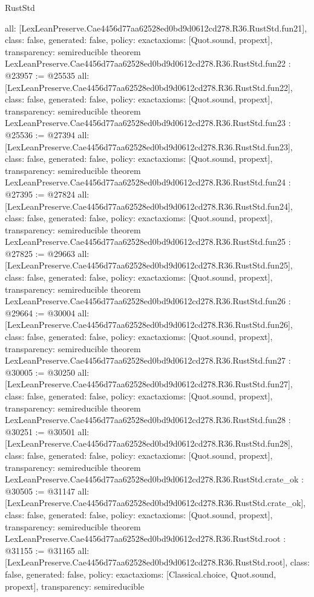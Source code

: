 \begin{lexlean}{RustStd}
\begin{coremodule}
{  all: [LexLeanPreserve.Cae4456d77aa62528ed0bd9d0612cd278.R36.RustStd.fun21],
  class: false,
  generated: false,
  policy: exact{axioms: [Quot.sound, propext]},
  transparency: semireducible
}
theorem LexLeanPreserve.Cae4456d77aa62528ed0bd9d0612cd278.R36.RustStd.fun22 : @23957 := @25535 {
  all: [LexLeanPreserve.Cae4456d77aa62528ed0bd9d0612cd278.R36.RustStd.fun22],
  class: false,
  generated: false,
  policy: exact{axioms: [Quot.sound, propext]},
  transparency: semireducible
}
theorem LexLeanPreserve.Cae4456d77aa62528ed0bd9d0612cd278.R36.RustStd.fun23 : @25536 := @27394 {
  all: [LexLeanPreserve.Cae4456d77aa62528ed0bd9d0612cd278.R36.RustStd.fun23],
  class: false,
  generated: false,
  policy: exact{axioms: [Quot.sound, propext]},
  transparency: semireducible
}
theorem LexLeanPreserve.Cae4456d77aa62528ed0bd9d0612cd278.R36.RustStd.fun24 : @27395 := @27824 {
  all: [LexLeanPreserve.Cae4456d77aa62528ed0bd9d0612cd278.R36.RustStd.fun24],
  class: false,
  generated: false,
  policy: exact{axioms: [Quot.sound, propext]},
  transparency: semireducible
}
theorem LexLeanPreserve.Cae4456d77aa62528ed0bd9d0612cd278.R36.RustStd.fun25 : @27825 := @29663 {
  all: [LexLeanPreserve.Cae4456d77aa62528ed0bd9d0612cd278.R36.RustStd.fun25],
  class: false,
  generated: false,
  policy: exact{axioms: [Quot.sound, propext]},
  transparency: semireducible
}
theorem LexLeanPreserve.Cae4456d77aa62528ed0bd9d0612cd278.R36.RustStd.fun26 : @29664 := @30004 {
  all: [LexLeanPreserve.Cae4456d77aa62528ed0bd9d0612cd278.R36.RustStd.fun26],
  class: false,
  generated: false,
  policy: exact{axioms: [Quot.sound, propext]},
  transparency: semireducible
}
theorem LexLeanPreserve.Cae4456d77aa62528ed0bd9d0612cd278.R36.RustStd.fun27 : @30005 := @30250 {
  all: [LexLeanPreserve.Cae4456d77aa62528ed0bd9d0612cd278.R36.RustStd.fun27],
  class: false,
  generated: false,
  policy: exact{axioms: [Quot.sound, propext]},
  transparency: semireducible
}
theorem LexLeanPreserve.Cae4456d77aa62528ed0bd9d0612cd278.R36.RustStd.fun28 : @30251 := @30501 {
  all: [LexLeanPreserve.Cae4456d77aa62528ed0bd9d0612cd278.R36.RustStd.fun28],
  class: false,
  generated: false,
  policy: exact{axioms: [Quot.sound, propext]},
  transparency: semireducible
}
theorem LexLeanPreserve.Cae4456d77aa62528ed0bd9d0612cd278.R36.RustStd.crate_ok : @30505 := @31147 {
  all: [LexLeanPreserve.Cae4456d77aa62528ed0bd9d0612cd278.R36.RustStd.crate_ok],
  class: false,
  generated: false,
  policy: exact{axioms: [Quot.sound, propext]},
  transparency: semireducible
}
theorem LexLeanPreserve.Cae4456d77aa62528ed0bd9d0612cd278.R36.RustStd.root : @31155 := @31165 {
  all: [LexLeanPreserve.Cae4456d77aa62528ed0bd9d0612cd278.R36.RustStd.root],
  class: false,
  generated: false,
  policy: exact{axioms: [Classical.choice, Quot.sound, propext]},
  transparency: semireducible
}


\end{coremodule}
\end{lexlean}
